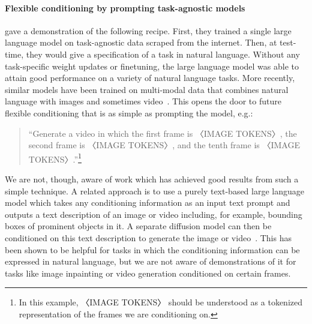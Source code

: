 \paragraph{Flexible conditioning by prompting task-agnostic models}
\citet{brown2020language} gave a demonstration of the following recipe. First, they trained a single large language model on task-agnostic data scraped from the internet. Then, at test-time, they would give a specification of a task in natural language. Without any task-specific weight updates or finetuning, the large language model was able to attain good performance on a variety of natural language tasks. More recently, similar models have been trained on multi-modal data that combines natural language with images and sometimes video~\citep{openai2023gpt,team2023gemini,kondratyuk2023videopoet}. This opens the door to future flexible conditioning that is as simple as prompting the model, e.g.: 
\begin{quote}
    ``Generate a video in which the first frame is 〈IMAGE TOKENS〉, the second frame is 〈IMAGE TOKENS〉, and the tenth frame is 〈IMAGE TOKENS〉.''\footnote{In this example, 〈IMAGE TOKENS〉 should be understood as a tokenized representation of the frames we are conditioning on.}
\end{quote}
We are not, though, aware of work which has achieved good results from such a simple technique. A related approach is to use a purely text-based large language model which takes any conditioning information as an input text prompt and outputs a text description of an image or video including, for example, bounding boxes of prominent objects in it. A separate diffusion model can then be conditioned on this text description to generate the image or video~\citep{lian2023llm}. This has been shown to be helpful for tasks in which the conditioning information can be expressed in natural language, but we are not aware of demonstrations of it for tasks like image inpainting or video generation conditioned on certain frames.

